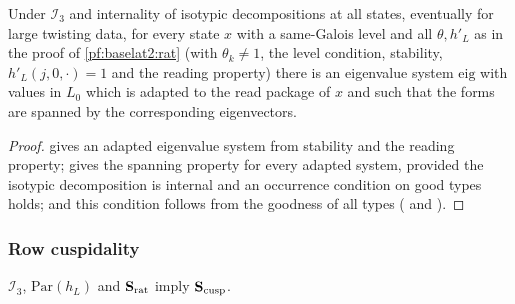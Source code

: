 \begin{lemma}\label{pf:baselat2:eigspan}
Under $\mathcal{I}_3$ and internality of isotypic decompositions at all states, eventually
for large twisting data, for every state $x$ with a same-Galois level and all $\theta,h'_L$ as in the
proof of \cref{pf:baselat2:rat} (with $\theta_k\ne1$, the level condition, stability, $h'_L(j,0,\cdot)=1$ and
the reading property) there is an eigenvalue system $\mathrm{eig}$ with values in $L_0$ which is adapted to
the read package of $x$ and such that the forms are spanned by the corresponding eigenvectors.
\end{lemma}

\begin{proof}
 gives an adapted eigenvalue system
from stability and the reading property;  gives the
spanning property for every adapted system, provided the isotypic decomposition is internal and an
occurrence condition on good types holds; and this condition follows from the goodness of all types
( and ).
\end{proof}

\subsubsection{Row cuspidality}

\begin{proposition}\label{pf:baselat2:cusp}
$\mathcal{I}_3$, $\mathrm{Par}(h_L)$ and $\mathbf{S}_{\mathrm{rat}}$ imply $\mathbf{S}_{\mathrm{cusp}}$.
\end{proposition}

